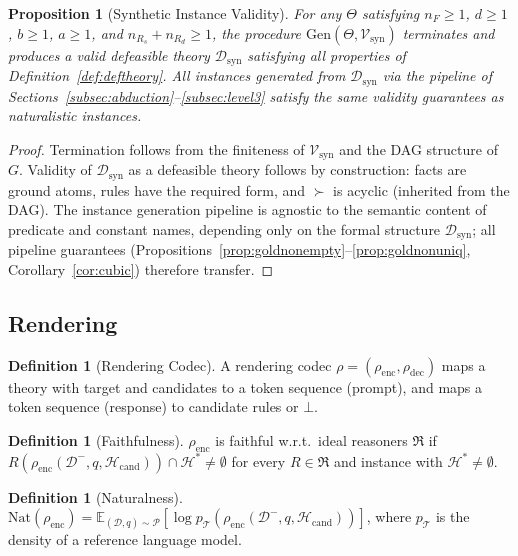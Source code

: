 \documentclass{article}
\newtheorem{proposition}[theorem]{Proposition}
\theoremstyle{definition}
\newtheorem{definition}[theorem]{Definition}
\newcommand{\D}{\mathcal{D}}
\newcommand{\Dm}{\mathcal{D}^{-}}
\newcommand{\Hcand}{\mathcal{H}_{\mathrm{cand}}}
\newcommand{\Hgold}{\mathcal{H}^{*}}
\newcommand{\Rs}{R_s}
\newcommand{\Rd}{R_d}
\newcommand{\Nat}{\mathrm{Nat}}
\begin{document}
\begin{proposition}[Synthetic Instance Validity]\label{prop:synthvalid}
For any $\Theta$ satisfying $n_F \geq 1$, $d \geq 1$, $b \geq 1$, $a \geq 1$, and $n_{\Rs} + n_{\Rd} \geq 1$, the procedure $\mathrm{Gen}(\Theta, \mathcal{V}_{\mathrm{syn}})$ terminates and produces a valid defeasible theory $\D_{\mathrm{syn}}$ satisfying all properties of Definition~\ref{def:deftheory}. All instances generated from $\D_{\mathrm{syn}}$ via the pipeline of Sections~\ref{subsec:abduction}--\ref{subsec:level3} satisfy the same validity guarantees as naturalistic instances.
\end{proposition}

\begin{proof}
Termination follows from the finiteness of $\mathcal{V}_{\mathrm{syn}}$ and the DAG structure of $G$. Validity of $\D_{\mathrm{syn}}$ as a defeasible theory follows by construction: facts are ground atoms, rules have the required form, and $\succ$ is acyclic (inherited from the DAG). The instance generation pipeline is agnostic to the semantic content of predicate and constant names, depending only on the formal structure $\D_{\mathrm{syn}}$; all pipeline guarantees (Propositions~\ref{prop:goldnonempty}--\ref{prop:goldnonuniq}, Corollary~\ref{cor:cubic}) therefore transfer.
\end{proof}


\subsection{Rendering}\label{subsec:rendering_defs}

\begin{definition}[Rendering Codec]\label{def:codec}
A rendering codec $\rho = (\rho_{\mathrm{enc}}, \rho_{\mathrm{dec}})$ maps a theory with target and candidates to a token sequence (prompt), and maps a token sequence (response) to candidate rules or $\bot$.
\end{definition}

\begin{definition}[Faithfulness]\label{def:faithful}
$\rho_{\mathrm{enc}}$ is faithful w.r.t.\ ideal reasoners $\mathfrak{R}$ if $R(\rho_{\mathrm{enc}}(\Dm, q, \Hcand)) \cap \Hgold \neq \emptyset$ for every $R \in \mathfrak{R}$ and instance with $\Hgold \neq \emptyset$.
\end{definition}

\begin{definition}[Naturalness]\label{def:naturalness}
$\Nat(\rho_{\mathrm{enc}}) = \mathbb{E}_{(\D, q) \sim \mathcal{P}}[\log p_{\mathcal{T}}(\rho_{\mathrm{enc}}(\Dm, q, \Hcand))]$, where $p_\mathcal{T}$ is the density of a reference language model.
\end{definition}
\end{document}
